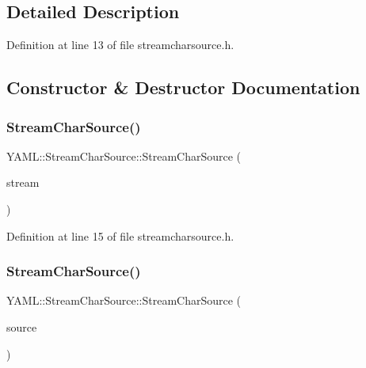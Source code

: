 \subsection{Detailed Description}


Definition at line 13 of file streamcharsource.\+h.



\subsection{Constructor \& Destructor Documentation}
\mbox{\label{class_y_a_m_l_1_1_stream_char_source_a960dca86d416a4544437e26815bd8212}} 
\subsubsection{\texorpdfstring{StreamCharSource()}{StreamCharSource()}\hspace{0.1cm}{\footnotesize\ttfamily [1/3]}}
{\footnotesize\ttfamily Y\+A\+M\+L\+::\+Stream\+Char\+Source\+::\+Stream\+Char\+Source (\begin{DoxyParamCaption}\item[{const \mbox{\hyperlink{class_y_a_m_l_1_1_stream}{Stream}} \&}]{stream }\end{DoxyParamCaption})\hspace{0.3cm}{\ttfamily [inline]}}



Definition at line 15 of file streamcharsource.\+h.

\mbox{\label{class_y_a_m_l_1_1_stream_char_source_ad6af81e7c3484236365ffc3bba6a8812}} 
\subsubsection{\texorpdfstring{StreamCharSource()}{StreamCharSource()}\hspace{0.1cm}{\footnotesize\ttfamily [2/3]}}
{\footnotesize\ttfamily Y\+A\+M\+L\+::\+Stream\+Char\+Source\+::\+Stream\+Char\+Source (\begin{DoxyParamCaption}\item[{const \mbox{\hyperlink{class_y_a_m_l_1_1_stream_char_source}{Stream\+Char\+Source}} \&}]{source }\end{DoxyParamCaption})\hspace{0.3cm}{\ttfamily [inline]}}



